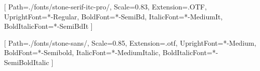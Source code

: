 \usepackage{microtype}
\usepackage{setspace}

\setlength{\parskip}{0em}
\setlength{\parindent}{1em}
\linespread{1}

\newcommand{\titleoriginal}{The Sovereign Individual}
\newcommand{\subtitleoriginal}{Mastering the Transition to the Information Age}
\newcommand{\yearoriginal}{1999}
\newcommand{\subtitletranslation}{Der Übergang zum Informationszeitalter}
\newcommand{\yeartranslation}{2024}
\newcommand{\stringtranslation}{Übersetzung}
\newcommand{\stringlicense}{Alle Rechte vorbehalten.}
\newcommand{\stringpublisher}{Verlag}
\newcommand{\ISBNHC}{978-9916-749-25-8}
\newcommand{\ISBNSC}{978-9916-749-26-5}
\newcommand{\ISBNEBOOK}{978-9916-749-27-2}
\newcommand{\ISBNAUDIO}{978-9916-749-29-6}
\newcommand{\press}{Konsensus Network}
\newcommand{\translatorone}{Andreas Tank}
\newcommand{\translators}{
\large\textit{\stringtranslation:}\\
\translatorone\\
}

\setstocksize{210mm}{148mm}
\settrimmedsize{210mm}{148mm}{*}
\setbinding{7mm}
\setlrmarginsandblock{15mm}{16mm}{*}
\setulmarginsandblock{16mm}{16mm}{*}
\setlength{\skip\footins}{18pt} %

\usepackage{fontspec}
\setmainfont{stone-serif}[
    Path=./fonts/stone-serif-itc-pro/,
    Scale=0.83,
    Extension=.OTF,
    UprightFont=*-Regular,
    BoldFont=*-SemiBd,
    ItalicFont=*-MediumIt,
    BoldItalicFont=*-SemiBdIt
    ]

\setsansfont{stone-sans}[
    Path=./fonts/stone-sans/,
    Scale=0.85,
    Extension=.otf,
    UprightFont=*-Medium,
    BoldFont=*-Semibold,
    ItalicFont=*-MediumItalic,
    BoldItalicFont=*-SemiBoldItalic
    ]

\usepackage{lettrine}
\setcounter{DefaultLines}{3}
\renewcommand{\DefaultLoversize}{0.1}
\renewcommand{\DefaultLraise}{0}
\renewcommand{\LettrineTextFont}{}
\setlength{\DefaultFindent}{\fontdimen2\font}
\setlength{\DefaultNindent}{0em}

\makeatletter
\newcommand*\halftitlepage{\begingroup %
  \setlength\drop{0.1\textheight}
  \vspace*{\drop}
  \rule{\textwidth}{0in}\par
  {\Large\sffamily\thetitle\par}
  \rule{\textwidth}{0in}\par
  \vfill
\endgroup}
\makeatother

